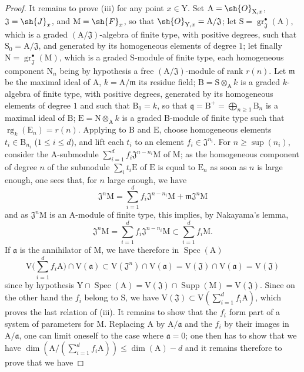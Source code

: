 \begin{proof}
It remains to prove (iii) for any point $x\in\mathrm{Y}$. Set $\mathrm{A}=\sh{O}_{\mathrm{X},x}$, $\mathfrak{J}=\sh{J}_x$, and $\mathrm{M}=\sh{F}_x$, so that $\sh{O}_{\mathrm{Y},x}=\mathrm{A}/\mathfrak{J}$; let $\mathrm{S}=\operatorname{gr}^{\bullet}_\mathfrak{J}(\mathrm{A})$, which is a graded $(\mathrm{A}/\mathfrak{J})$-algebra of finite type, with positive degrees, such that $\mathrm{S}_0=\mathrm{A}/\mathfrak{J}$, and generated by its homogeneous elements of degree $1$; let finally $\mathrm{N}=\operatorname{gr}^{\bullet}_\mathfrak{J}(\mathrm{M})$, which is a graded $\mathrm{S}$-module of finite type, each homogeneous component $\mathrm{N}_n$ being by hypothesis a free $(\mathrm{A}/\mathfrak{J})$-module of rank $r(n)$. Let $\mathfrak{m}$ be the maximal ideal of $\mathrm{A}$, $k=\mathrm{A}/\mathfrak{m}$ its residue field; $\mathrm{B}=\mathrm{S}\otimes_\mathrm{A}k$ is a graded $k$-algebra of finite type, with positive degrees, generated by its homogeneous elements of degree $1$ and such that $\mathrm{B}_0=k$, so that $\mathfrak{q}=\mathrm{B}^+=\bigoplus_{n\geqslant 1}\mathrm{B}_n$ is a maximal ideal of $\mathrm{B}$; $\mathrm{E}=\mathrm{N}\otimes_\mathrm{A}k$ is a graded $\mathrm{B}$-module of finite type such that $\operatorname{rg}_k(\mathrm{E}_n)=r(n)$. Applying  to $\mathrm{B}$ and $\mathrm{E}$, choose homogeneous elements $t_i\in\mathrm{B}_{n_i}$ ($1\leqslant i\leqslant d$), and lift each $t_i$ to an element $f_i\in\mathfrak{J}^{n_i}$. For $n\geqslant\sup(n_i)$, consider the $\mathrm{A}$-submodule $\sum_{i=1}^d f_i\mathfrak{J}^{n-n_i}\mathrm{M}$ of $\mathrm{M}$; as the homogeneous component of degree $n$ of the submodule $\sum_i t_i\mathrm{E}$ of $\mathrm{E}$ is equal to $\mathrm{E}_n$ as soon as $n$ is large enough, one sees that, for $n$ large enough, we have
\[
\mathfrak{J}^n\mathrm{M} = \sum_{i=1}^d f_i\mathfrak{J}^{n-n_i}\mathrm{M}+\mathfrak{m}\mathfrak{J}^n\mathrm{M}
\]
and as $\mathfrak{J}^n\mathrm{M}$ is an $\mathrm{A}$-module of finite type, this implies, by Nakayama's lemma,
\[
\mathfrak{J}^n\mathrm{M} = \sum_{i=1}^d f_i\mathfrak{J}^{n-n_i}\mathrm{M} \subset \sum_{i=1}^d f_i\mathrm{M}.
\]
If $\mathfrak{a}$ is the annihilator of $\mathrm{M}$, we have therefore  in $\operatorname{Spec}(\mathrm{A})$
\[
\mathrm{V}\Big(\sum_{i=1}^d f_i\mathrm{A}\Big)\cap\mathrm{V}(\mathfrak{a})\subset\mathrm{V}(\mathfrak{J}^n)\cap\mathrm{V}(\mathfrak{a})=\mathrm{V}(\mathfrak{J})\cap\mathrm{V}(\mathfrak{a})=\mathrm{V}(\mathfrak{J})
\]
since by hypothesis $\mathrm{Y}\cap\operatorname{Spec}(\mathrm{A})=\mathrm{V}(\mathfrak{J})\cap\operatorname{Supp}(\mathrm{M})=\mathrm{V}(\mathfrak{J})$. Since on the other hand the $f_i$ belong to $\mathrm{S}$, we have $\mathrm{V}(\mathfrak{J})\subset\mathrm{V}(\sum_{i=1}^d f_i\mathrm{A})$, which proves the last relation of (iii). It remains to show that the $f_i$ form part of a system of parameters for $\mathrm{M}$. Replacing $\mathrm{A}$ by $\mathrm{A}/\mathfrak{a}$ and the $f_i$ by their images in $\mathrm{A}/\mathfrak{a}$, one can limit oneself to the case where $\mathfrak{a}=0$; one then has to show that we have $\dim(\mathrm{A}/(\sum_{i=1}^d f_i\mathrm{A}))\leqslant\dim(\mathrm{A})-d$ and it remains therefore to prove  that we have

\end{proof}
